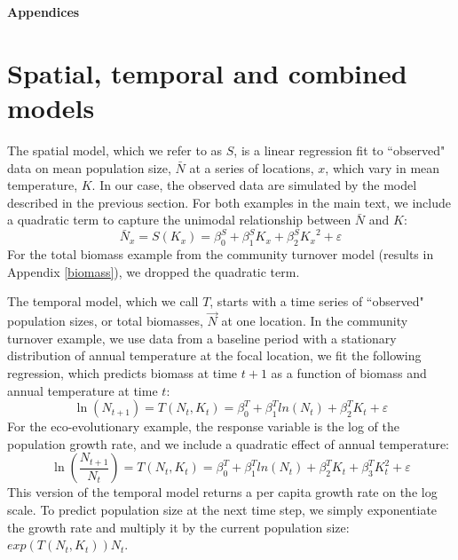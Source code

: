 \documentclass[11pt]{article}
\begin{document}
\newpage
\renewcommand{\refname}{Literature cited}





\clearpage 
\newpage 

\setcounter{page}{1}
\setcounter{equation}{0}
\setcounter{figure}{0}
\setcounter{section}{0}
\setcounter{table}{0}

\centerline{\Large \textbf{Appendices}}

\renewcommand{\thesection}{\Alph{section}}

\section{Spatial, temporal and combined models}\label{models}

The spatial model, which we refer to as $S$, is a linear regression fit to ``observed" data on mean population size, $\bar{N}$ at a series of locations, $x$, which vary in mean temperature, $K$. In our case, the observed data are simulated by the model described in the previous section. For both examples in the main text, we include a quadratic term to capture the unimodal relationship between  $\bar{N}$ and $K$:
 \begin{equation}
 \bar{N}_x = S(K_x) = \beta^S_0 +  \beta^S_1 K_x +\beta^S_2 {K_x}^2 + \varepsilon
 \label{eqn:spatial_regression}
 \end{equation}
For the total biomass example from the community turnover model (results in Appendix \ref{biomass}), we dropped the quadratic term.

The temporal model, which we call $T$, starts with a time series of ``observed" population sizes, or total biomasses, $\vec{N}$ at one location. In the community turnover example, we use data from a baseline period with a stationary distribution of annual temperature at the focal location, we fit the following regression, which predicts biomass at time $t+1$ as a function of biomass and annual temperature at time $t$:
 \begin{equation}
 \ln(N_{t+1}) = T(N_t,K_t) = \beta^T_0 +  \beta^T_1 ln(N_t) +\beta^T_2 K_t  +  \varepsilon
 \label{eqn:temporal_regression_community}
 \end{equation}
 For the eco-evolutionary example, the response variable is the log of the population growth rate, and we include a quadratic effect of annual temperature:
  \begin{equation}
  \ln(\frac{N_{t+1}}{N_t}) = T(N_t,K_t) = \beta^T_0 +  \beta^T_1 ln(N_t) +\beta^T_2 K_t  +\beta^T_3 K_t^2 +  \varepsilon
  \label{eqn:temporal_regression_ecoevo}
  \end{equation}
 This version of the temporal model returns a per capita growth rate on the log scale. To predict population size at the next time step, we simply exponentiate the growth rate and multiply it by the current population size: $exp(T(N_t,K_t)) N_t$.
\end{document}
